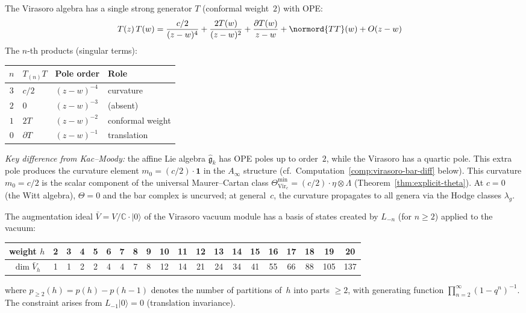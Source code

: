 \begin{computation}\label{comp:virasoro-ope}
The Virasoro algebra has a single strong generator $T$ (conformal weight~$2$) with OPE:
\begin{align*}
T(z)\,T(w) &= \frac{c/2}{(z-w)^4} + \frac{2T(w)}{(z-w)^2} + \frac{\partial T(w)}{z-w} + \normord{TT}(w) + O(z-w)
\end{align*}
The $n$-th products (singular terms):
\begin{center}
\begin{tabular}{clll}
$n$ & $T_{(n)}T$ & Pole order & Role \\
\hline
$3$ & $c/2$ & $(z\!-\!w)^{-4}$ & curvature \\
$2$ & $0$ & $(z\!-\!w)^{-3}$ & (absent) \\
$1$ & $2T$ & $(z\!-\!w)^{-2}$ & conformal weight \\
$0$ & $\partial T$ & $(z\!-\!w)^{-1}$ & translation
\end{tabular}
\end{center}

\emph{Key difference from Kac--Moody:} the affine Lie algebra $\widehat{\mathfrak{g}}_k$ has OPE poles up to order~$2$, while the Virasoro has a quartic pole.  This extra pole produces the curvature element $m_0 = (c/2)\cdot\mathbf{1}$ in the $A_\infty$ structure (cf.\ Computation~\ref{comp:virasoro-bar-diff} below).
This curvature $m_0 = c/2$ is the scalar component of the
universal Maurer--Cartan class
$\Theta_{\mathrm{Vir}_c}^{\min} = (c/2)\cdot\eta\otimes\Lambda$
(Theorem~\ref{thm:explicit-theta}).  At $c = 0$ (the Witt algebra),
$\Theta = 0$ and the bar complex is uncurved; at general~$c$,
the curvature propagates to all genera via the Hodge classes $\lambda_g$.
\end{computation}

\begin{computation}\label{comp:virasoro-vacuum}
The augmentation ideal $\bar{V} = V/\mathbb{C}\cdot|0\rangle$ of the Virasoro vacuum module has a basis of states created by $L_{-n}$ (for $n \geq 2$) applied to the vacuum:
\begin{center}
{\small
\begin{tabular}{c|ccccccccccccccccccc}
weight $h$ & 2 & 3 & 4 & 5 & 6 & 7 & 8 & 9 & 10 & 11 & 12 & 13 & 14 & 15 & 16 & 17 & 18 & 19 & 20 \\
\hline
$\dim \bar{V}_h$ & 1 & 1 & 2 & 2 & 4 & 4 & 7 & 8 & 12 & 14 & 21 & 24 & 34 & 41 & 55 & 66 & 88 & 105 & 137
\end{tabular}
}
\end{center}
where $p_{\geq 2}(h) = p(h) - p(h-1)$ denotes the number of partitions of~$h$ into parts $\geq 2$, with generating function $\prod_{n=2}^{\infty}(1-q^n)^{-1}$.  The constraint arises from $L_{-1}|0\rangle = 0$ (translation invariance).
\end{computation}

